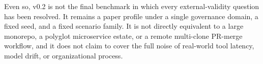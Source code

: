 \documentclass[9pt,letterpaper]{extarticle}
\begin{document}
Even so, v0.2 is not the final benchmark in which every external-validity question has been resolved. It remains a paper profile under a single governance domain, a fixed seed, and a fixed scenario family. It is not directly equivalent to a large monorepo, a polyglot microservice estate, or a remote multi-clone PR-merge workflow, and it does not claim to cover the full noise of real-world tool latency, model drift, or organizational process.

\begin{figure}[H]







































\end{figure}
\end{document}
